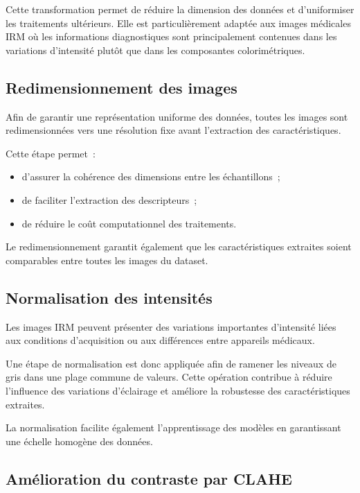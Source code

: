 Cette transformation permet de réduire la dimension des données et d'uniformiser les
traitements ultérieurs. Elle est particulièrement adaptée aux images médicales IRM où les
informations diagnostiques sont principalement contenues dans les variations d'intensité
plutôt que dans les composantes colorimétriques.

\subsection{Redimensionnement des images}

Afin de garantir une représentation uniforme des données, toutes les images sont
redimensionnées vers une résolution fixe avant l'extraction des caractéristiques.

Cette étape permet~:

\begin{itemize}[leftmargin=1.4em,itemsep=2pt]
  \item d'assurer la cohérence des dimensions entre les échantillons~;
  \item de faciliter l'extraction des descripteurs~;
  \item de réduire le coût computationnel des traitements.
\end{itemize}

Le redimensionnement garantit également que les caractéristiques extraites soient
comparables entre toutes les images du dataset.

\subsection{Normalisation des intensités}

Les images IRM peuvent présenter des variations importantes d'intensité liées aux conditions
d'acquisition ou aux différences entre appareils médicaux.

Une étape de normalisation est donc appliquée afin de ramener les niveaux de gris dans une
plage commune de valeurs. Cette opération contribue à réduire l'influence des variations
d'éclairage et améliore la robustesse des caractéristiques extraites.

La normalisation facilite également l'apprentissage des modèles en garantissant une échelle
homogène des données.

\subsection{Amélioration du contraste par CLAHE}

